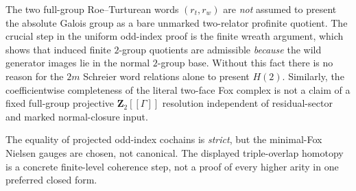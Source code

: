 \begin{warning}
\label{warn:dyadic-f135-not-naked-full-relators}
The two full-group
Roe--Turturean
words $(r_t,r_w)$
are \emph{not}
assumed to
present the
absolute Galois
group as a bare
unmarked
two-relator
profinite quotient.
The crucial
step in the
uniform odd-index
proof is the
finite wreath
argument, which
shows that
induced finite
$2$-group
quotients are
admissible
\emph{because}
the wild
generator images
lie in the normal
$2$-group base.
Without this
fact there is
no reason for
the $2m$
Schreier word
relations alone
to present $H(2)$.
Similarly, the
coefficientwise
completeness
of the literal
two-face Fox
complex is not
a claim of a
fixed full-group
projective
$\mathbf Z_2[[\Gamma]]$
resolution
independent of
residual-sector
and marked
normal-closure
input.

The equality
of projected
odd-index
cochains is
\emph{strict},
but the
minimal-Fox
Nielsen gauges
are chosen,
not canonical.
The displayed
triple-overlap
homotopy is
a concrete
finite-level
coherence step,
not a proof of
every higher
arity in one
preferred
closed form.
\end{warning}
